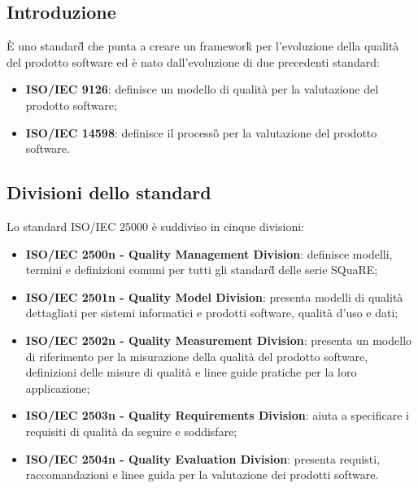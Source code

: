 \subsection{Introduzione}
È uno standard\G{} che punta a creare un framework\G{} per l'evoluzione della qualità del prodotto software ed è nato dall'evoluzione di due precedenti standard:
\begin{itemize}
	\item \textbf{ISO/IEC 9126}: definisce un modello di qualità per la valutazione del prodotto software;
	\item \textbf{ISO/IEC 14598}: definisce il processo\G{} per la valutazione del prodotto software.
\end{itemize}

\subsection{Divisioni dello standard}
Lo standard ISO/IEC 25000 è suddiviso in cinque divisioni:
\begin{itemize}
	\item \textbf{ISO/IEC 2500n - Quality Management Division}: definisce modelli, termini e definizioni comuni per tutti gli standard\G{} delle serie SQuaRE;
	\item \textbf{ISO/IEC 2501n - Quality Model Division}: presenta modelli di qualità dettagliati per sistemi informatici e prodotti software, qualità d'uso e dati;
	\item \textbf{ISO/IEC 2502n - Quality Measurement Division}: presenta un modello di riferimento per la misurazione della qualità del prodotto software, definizioni delle misure di qualità e linee guide pratiche per la loro applicazione;
	\item \textbf{ISO/IEC 2503n - Quality Requirements Division}: aiuta a specificare i requisiti di qualità da seguire e soddisfare;
	\item \textbf{ISO/IEC 2504n - Quality Evaluation Division}: presenta requisti, raccomandazioni e linee guida per la valutazione dei prodotti software.
\end{itemize}

